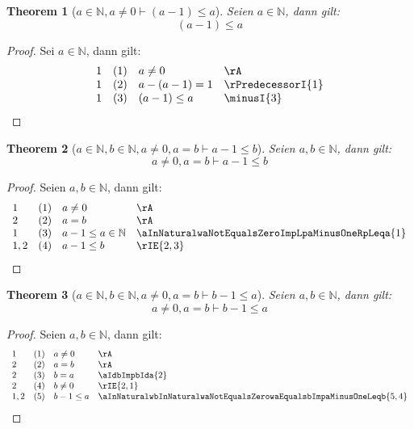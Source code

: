 \documentclass{book}
\theoremstyle{plain}
\newtheorem{theorem}{Theorem}
\theoremstyle{remark}
\theoremstyle{definition}
\begin{document}
\label{aInNaturalwaNotEqualsZeroImpLpaMinusOneRpLeqa}
\begin{theorem}[\(a\in\mathbb{N},a\neq 0\vdash (a-1)\leq a\)]
Seien \(a\in\mathbb{N}\), dann gilt:
\[(a-1)\leq a\]
\end{theorem}
\begin{proof}
    Sei \(a\in\mathbb{N}\), dann gilt:
        \[
	\begin{array}{llll}
            1   &  (1) & a\neq 0 & \rA \\
            1   &  (2) & a-(a-1)=1 & \rPredecessorI{1} \\
            1   &  (3) & (a-1)\leq a & \minusI{3} \\
    \end{array}
	\]
\end{proof}

\label{aInNaturalwbInNaturalwaNotEqualsZerowaEqualsbImpaMinusOneLeqb}
\begin{theorem}[\(a\in\mathbb{N},b\in\mathbb{N},a\neq 0, a=b\vdash a-1\leq b\)]
Seien \(a,b\in\mathbb{N}\), dann gilt:
\[a\neq 0, a=b\vdash a-1\leq b\]
\end{theorem}
\begin{proof}
    Seien \(a,b\in\mathbb{N}\), dann gilt:
        \[
	\begin{array}{llll}
            1     &  (1) & a\neq 0 & \rA \\
            2     &  (2) & a=b & \rA \\
            1   &  (3) & a-1\leq a\in\mathbb{N} & \aInNaturalwaNotEqualsZeroImpLpaMinusOneRpLeqa{1} \\
            1,2   &  (4) & a-1\leq b & \rIE{2,3} \\
    \end{array}
	\]
\end{proof}

\label{aInNaturalwbInNaturalwaNotEqualsZerowaEqualsbImpbMinusOneLeqa}
\begin{theorem}[\(a\in\mathbb{N},b\in\mathbb{N},a\neq 0, a=b\vdash b-1\leq a\)]
Seien \(a,b\in\mathbb{N}\), dann gilt:
\[a\neq 0, a=b\vdash b-1\leq a\]
\end{theorem}
\begin{proof}
    Seien \(a,b\in\mathbb{N}\), dann gilt:
        \[
	\begin{array}{llll}
            1     &  (1) & a\neq 0 & \rA \\
            2     &  (2) & a=b & \rA \\
            2     &  (3) & b=a & \aIdbImpbIda{2} \\
            2     &  (4) & b\neq 0 & \rIE{2,1} \\
            1,2   &  (5) & b-1\leq a & \aInNaturalwbInNaturalwaNotEqualsZerowaEqualsbImpaMinusOneLeqb{5,4} \\
    \end{array}
	\]
\end{proof}
\end{document}
